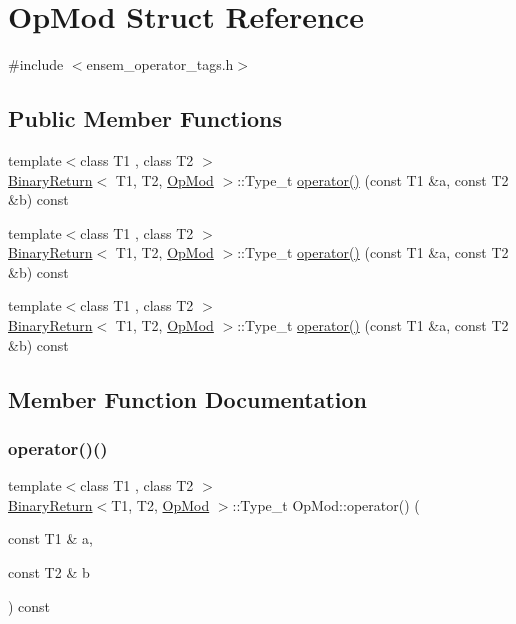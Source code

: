 \hypertarget{structOpMod}{}\section{Op\+Mod Struct Reference}
\label{structOpMod}


{\ttfamily \#include $<$ensem\+\_\+operator\+\_\+tags.\+h$>$}

\subsection*{Public Member Functions}
\begin{DoxyCompactItemize}
\item 
{\footnotesize template$<$class T1 , class T2 $>$ }\\\mbox{\hyperlink{structBinaryReturn}{Binary\+Return}}$<$ T1, T2, \mbox{\hyperlink{structOpMod}{Op\+Mod}} $>$\+::Type\+\_\+t \mbox{\hyperlink{structOpMod_a76039bd668de4b56b48f8d9c64bebce4}{operator()}} (const T1 \&a, const T2 \&b) const
\item 
{\footnotesize template$<$class T1 , class T2 $>$ }\\\mbox{\hyperlink{structBinaryReturn}{Binary\+Return}}$<$ T1, T2, \mbox{\hyperlink{structOpMod}{Op\+Mod}} $>$\+::Type\+\_\+t \mbox{\hyperlink{structOpMod_a76039bd668de4b56b48f8d9c64bebce4}{operator()}} (const T1 \&a, const T2 \&b) const
\item 
{\footnotesize template$<$class T1 , class T2 $>$ }\\\mbox{\hyperlink{structBinaryReturn}{Binary\+Return}}$<$ T1, T2, \mbox{\hyperlink{structOpMod}{Op\+Mod}} $>$\+::Type\+\_\+t \mbox{\hyperlink{structOpMod_a76039bd668de4b56b48f8d9c64bebce4}{operator()}} (const T1 \&a, const T2 \&b) const
\end{DoxyCompactItemize}


\subsection{Member Function Documentation}
\mbox{\label{structOpMod_a76039bd668de4b56b48f8d9c64bebce4}} 
\subsubsection{\texorpdfstring{operator()()}{operator()()}\hspace{0.1cm}{\footnotesize\ttfamily [1/3]}}
{\footnotesize\ttfamily template$<$class T1 , class T2 $>$ \\
\mbox{\hyperlink{structBinaryReturn}{Binary\+Return}}$<$T1, T2, \mbox{\hyperlink{structOpMod}{Op\+Mod}} $>$\+::Type\+\_\+t Op\+Mod\+::operator() (\begin{DoxyParamCaption}\item[{const T1 \&}]{a,  }\item[{const T2 \&}]{b }\end{DoxyParamCaption}) const\hspace{0.3cm}{\ttfamily [inline]}}

